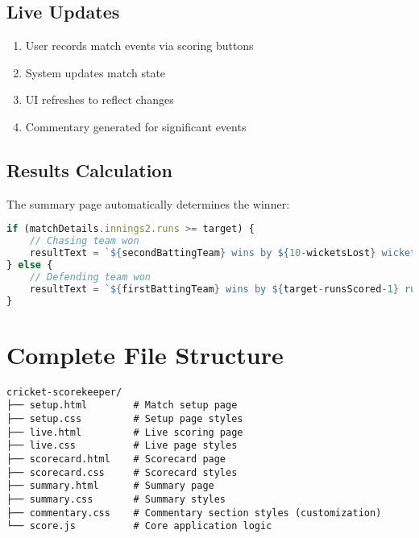 \documentclass[12pt]{article}
\begin{document}
\subsection*{Live Updates}
\begin{enumerate}
    \item User records match events via scoring buttons
    \item System updates match state
    \item UI refreshes to reflect changes
    \item Commentary generated for significant events
\end{enumerate}

\subsection*{Results Calculation}
The summary page automatically determines the winner:

\begin{lstlisting}[language=JavaScript]
if (matchDetails.innings2.runs >= target) {
    // Chasing team won
    resultText = `${secondBattingTeam} wins by ${10-wicketsLost} wickets`;
} else {
    // Defending team won
    resultText = `${firstBattingTeam} wins by ${target-runsScored-1} runs`;
}
\end{lstlisting}



\section*{Complete File Structure}
\begin{verbatim}
cricket-scorekeeper/
├── setup.html        # Match setup page
├── setup.css         # Setup page styles
├── live.html         # Live scoring page
├── live.css          # Live page styles
├── scorecard.html    # Scorecard page
├── scorecard.css     # Scorecard styles
├── summary.html      # Summary page
├── summary.css       # Summary styles
├── commentary.css    # Commentary section styles (customization)
└── score.js          # Core application logic

\end{verbatim}
\end{document}
